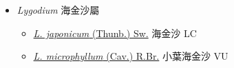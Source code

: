 
  \begin{itemize}
 \item[    ] \textit{Lygodium} 海金沙屬
                                
  \begin{itemize}
        \item[] \href{http://www.theplantlist.org/tpl1.1/search?q=Lygodium+japonicum}{\textit{L. japonicum} (Thunb.) Sw.}   海金沙   LC
        \item[] \href{http://www.theplantlist.org/tpl1.1/search?q=Lygodium+microphyllum}{\textit{L. microphyllum} (Cav.) R.Br.}   小葉海金沙   VU
  \end{itemize}
  \end{itemize}
